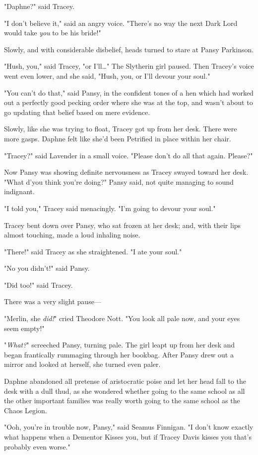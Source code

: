 "Daphne?" said Tracey.

"I don't believe it," said an angry voice. "There's no way the next Dark Lord
would take \emph{you} to be his bride!"

Slowly, and with considerable disbelief, heads turned to stare at Pansy
Parkinson.

"Hush, you," said Tracey, "or I'll{\ldots}" The Slytherin girl paused. Then
Tracey's voice went even lower, and she said, "Hush, you, or I'll devour your
soul."

"You can't do that," said Pansy, in the confident tones of a hen which had
worked out a perfectly good pecking order where she was at the top, and wasn't
about to go updating that belief based on mere evidence.

Slowly, like she was trying to float, Tracey got up from her desk. There were
more gasps. Daphne felt like she'd been Petrified in place within her chair.

"Tracey?" said Lavender in a small voice. "Please don't do all that again.
Please?"

Now Pansy was showing definite nervousness as Tracey swayed toward her desk.
"What d'you think you're doing?" Pansy said, not quite managing to sound
indignant.

"I told you," Tracey said menacingly. "I'm going to devour your soul."

Tracey bent down over Pansy, who sat frozen at her desk; and, with their lips
almost touching, made a loud inhaling noise.

"There!" said Tracey as she straightened. "I ate your soul."

"No you didn't!" said Pansy.

"Did too!" said Tracey.

There was a very slight pause---

"Merlin, she \emph{did!}" cried Theodore Nott. "You look all pale now, and your
eyes seem empty!"

"\emph{What?}" screeched Pansy, turning pale. The girl leapt up from her desk
and began frantically rummaging through her bookbag. After Pansy drew out a
mirror and looked at herself, she turned even paler.

Daphne abandoned all pretense of aristocratic poise and let her head fall to
the desk with a dull thud, as she wondered whether going to the same school as
all the other important families was really worth going to the same school as
the Chaos Legion.

"Ooh, you're in trouble now, Pansy," said Seamus Finnigan. "I don't know
exactly what happens when a Dementor Kisses you, but if Tracey Davis kisses you
that's probably even worse."

